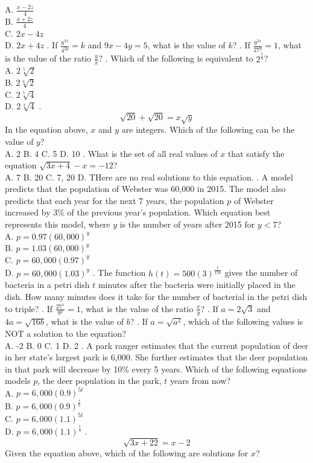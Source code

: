 \documentclass[../satmath.tex]{subfiles}
\begin{document}
\begin{enumerate}[label=\bfseries\arabic*.]
A. $\frac{x-2z}{4}$\\
B. $\frac{x+2z}{4}$\\
C. $2x-4z$\\
D. $2x+4z$
. If $\frac{8^{3x}}{4^{2y}}=k$ and $9x-4y=5$, what is the value of $k$?
. If $\frac{9^{3x}}{27^y}=1$, what is the value of the ratio $\frac{y}{x}$?
. Which of the following is equivalent to $2^{\frac{5}{4}}$?\\
A. $2\sqrt[5]{2}$\\
B. $2\sqrt[4]{2}$\\
C. $2\sqrt[5]{4}$\\
D. $2\sqrt[4]{4}$
. 
\[\sqrt{20}+\sqrt{20}=x\sqrt{y}\]
In the equation above, $x$ and $y$ are integers. Which of the following can be the value of $y$?\\
A. 2 \quad B. 4 \quad C. 5 \quad D. 10
. What is the set of all real values of $x$ that satisfy the equation $\sqrt{3x+4}-x=-12$? \\
A. {7} \quad B. {20} \quad C. {7, 20} \quad D. THere are no real solutions to this equation.
. A model predicts that the population of Webster was 60,000 in 2015. The model also predicts that each year for the next 7 years, the population $p$ 
of Webster increased by 3\% of the previous year's population. Which equation best represents this model, where $y$ is the number of years after 2015 for $y<7$?\\
A. $p=0.97(60,000)^y$\\
B. $p=1.03(60,000)^y$\\
C. $p=60,000(0.97)^y$\\
D. $p=60,000(1.03)^y$
. The function $h(t)=500(3)^{\frac{t}{150}}$ gives the number of bacteria in a petri dish $t$ minutes after the bacteria were initially placed 
in the dish. How many minutes does it take for the number of bacterial in the petri dish to triple?
. If $\frac{27^x}{9^y}=1$, what is the value of the ratio $\frac{x}{y}$?
. If $a=2\sqrt{3}$ and $4a=\sqrt{16b}$, what is the value of $b$?
. If $a=\sqrt{a^2}$, which of the following values is NOT a solution to the equation?\\
A. -2 \quad B. 0 \quad C. 1 \quad D. 2
. A park ranger estimates that the current population of deer in her state's largest park is 6,000. She further estimates that the deer population 
in that park will decrease by 10\% every 5 years. Which of the following equations models $p$, the deer population in the park, $t$ years from now?\\
A. $p=6,000(0.9)^{5t}$\\
B. $p=6,000(0.9)^{\frac{t}{5}}$\\
C. $p=6,000(1.1)^{5t}$\\
D. $p=6,000(1.1)^{\frac{t}{5}}$
. 
\[\sqrt{3x+22}=x-2\]
Given the equation above, which of the following are solutions for $x$?


\end{enumerate}
\end{document}
